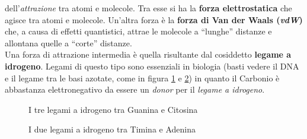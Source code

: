 \documentclass[a4paper,12pt, oneside]{book}
\begin{document}
dell'\textit{attrazione} tra atomi e molecole. Tra esse si ha la \textbf{forza
  elettrostatica} che agisce tra atomi e molecole. Un'altra forza è la
\textbf{forza di Van der Waals (\textit{vdW})} che, a causa di effetti
quantistici, attrae le molecole a ``lunghe'' distanze e allontana quelle a
``corte'' distanze. \\
Una forza di attrazione intermedia è quella risultante dal cosiddetto
\textbf{legame a idrogeno}. Legami di questo tipo sono essenziali in biologia
(basti vedere il DNA e il legame tra le basi azotate, come in figura
\ref{fig:hyd} e \ref{fig:hyd2}) in quanto il Carbonio è abbastanza
elettronegativo da essere un \textit{donor} per il \textit{legame a idrogeno}.\\
\begin{figure}
  \centering
  \qquad
  \caption{I tre legami a idrogeno tra Guanina e Citosina}
  \label{fig:hyd}
\end{figure}
\begin{figure}
  \centering
  \qquad
  \caption{I due legami a idrogeno tra Timina e Adenina}
  \label{fig:hyd2}
\end{figure}
\newpage
\end{document}
